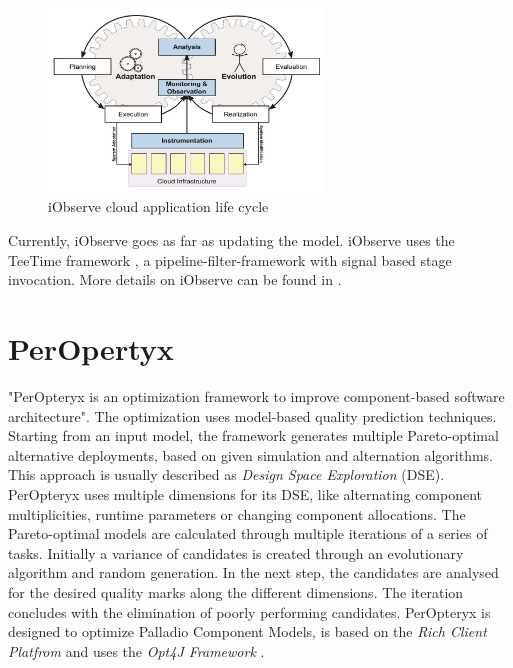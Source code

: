 \begin{figure}[h]
	\centering
	\includegraphics[width=0.65\textwidth]{pictures/iObserve_principle}
	\caption{iObserve cloud application life cycle \cite{Heinrich.2016b}}
	\label{fig:intro:iObserve}
\end{figure}

Currently, iObserve goes as far as updating the model. iObserve uses the TeeTime framework \cite{teetime.16.05.2017}, a pipeline-filter-framework with signal based stage invocation. More details on iObserve can be found in \cite{Heinrich.2016b}\cite{Heinrich.2016}.

\section{PerOpertyx}
\label{sec:Foundations:peropteryx}

"PerOpteryx is an optimization framework to improve component-based software architecture"\cite{PerOpteryx.b}. The optimization uses model-based quality prediction techniques. Starting from an input model, the framework generates multiple Pareto-optimal alternative deployments, based on given simulation and alternation algorithms. This approach is usually described as \textit{Design Space Exploration} (DSE). PerOpteryx uses multiple dimensions for its DSE, like alternating component multiplicities, runtime parameters or changing component allocations. The Pareto-optimal models are calculated through multiple iterations of a series of tasks. Initially a variance of candidates is created through an evolutionary algorithm and random generation. In the next step, the candidates are analysed for the desired quality marks along the different dimensions. The iteration concludes with the elimination of poorly performing candidates. PerOpteryx is designed to optimize Palladio Component Models, is based on the \textit{Rich Client Platfrom} and uses the \textit{Opt4J Framework} \cite{Martens.2010}.



